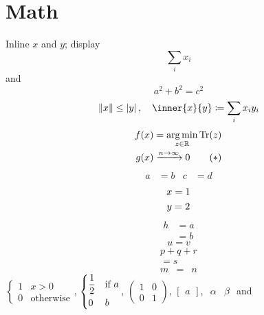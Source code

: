 \section{Math}
Inline $x$ and \(y\); display \[ \sum_i x_i \] and
$$ a^2 + b^2 = c^2 $$
\begin{equation}\label{eq:one}
  \norm{x} \le \abs{y}, \quad \inner{x}{y} \coloneqq \sum_i x_i y_i
\end{equation}
\begin{align}
  f(x) &= \operatorname*{arg\,min}_{z \in \mathbb{R}} \operatorname{Tr}(z) \nonumber \\
  g(x) &\xrightarrow{n \to \infty} 0 \tag{$*$}
\end{align}
\begin{align*} a &= b & c &= d \end{align*}
\begin{gather} x = 1 \notag \\ y = 2 \end{gather}
\begin{equation}\begin{split} h &= a \\ &= b \end{split}\end{equation}
\begin{subequations}\begin{equation} u = v \end{equation}\end{subequations}
\begin{multline} p + q + r \\ = s \end{multline}
\begin{eqnarray} m &=& n \end{eqnarray}
$\begin{cases} 1 & x > 0 \\ 0 & \text{otherwise} \end{cases}$,
$\begin{dcases} \frac{1}{2} & \mbox{if } a \\ 0 & b \end{dcases}$,
$\begin{pmatrix} 1 & 0 \\ 0 & 1 \end{pmatrix}$,
$\begin{bmatrix} a \end{bmatrix}$,
$\begin{array}{cc} \alpha & \beta \end{array}$ and

